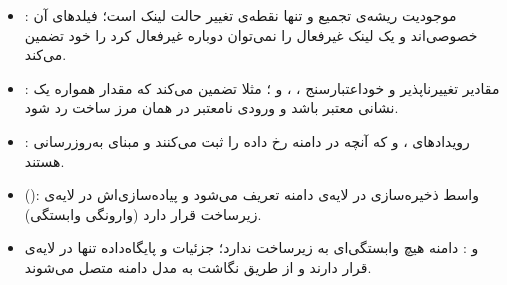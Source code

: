 \begin{itemize}
	\item {:} موجودیت  ریشه‌ی تجمیع و تنها نقطه‌ی تغییر حالت لینک است؛ فیلدهای آن خصوصی‌اند و  یک لینک غیرفعال را نمی‌توان دوباره غیرفعال کرد را خود تضمین می‌کند.
	\item {:} مقادیر تغییرناپذیر و خوداعتبارسنج ، ،  و ؛ مثلا  تضمین می‌کند که مقدار همواره یک نشانی معتبر  باشد و ورودی نامعتبر در همان مرز ساخت رد شود.
	\item {:} رویدادهای ،  و  که آنچه در دامنه رخ داده را ثبت می‌کنند و مبنای به‌روزرسانی  هستند.
	\item { ():} واسط ذخیره‌سازی  در لایه‌ی دامنه تعریف می‌شود و پیاده‌سازی‌اش در لایه‌ی زیرساخت قرار دارد (وارونگی وابستگی).
	\item { و :} دامنه هیچ وابستگی‌ای به زیرساخت ندارد؛ جزئیات  و پایگاه‌داده تنها در لایه‌ی  قرار دارند و از طریق نگاشت به مدل دامنه متصل می‌شوند.
\end{itemize}
